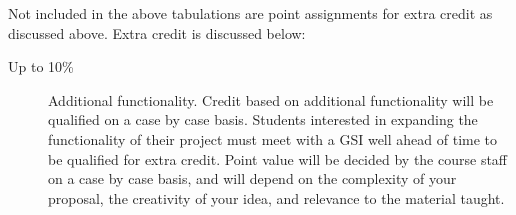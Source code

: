 \documentclass[11pt]{article}
\begin{document}
Not included in the above tabulations are point assignments for extra credit as discussed above. Extra credit is discussed below:

\begin{description}
  \item[Up to 10\%] Additional functionality. Credit based on additional functionality will be qualified on a case by case basis. Students interested in expanding the functionality of their project must meet with a GSI well ahead of time to be qualified for extra credit. Point value will be decided by the course staff on a case by case basis, and will depend on the complexity of your proposal, the creativity of your idea, and relevance to the material taught.
\end{description}

\newpage
\end{document}

